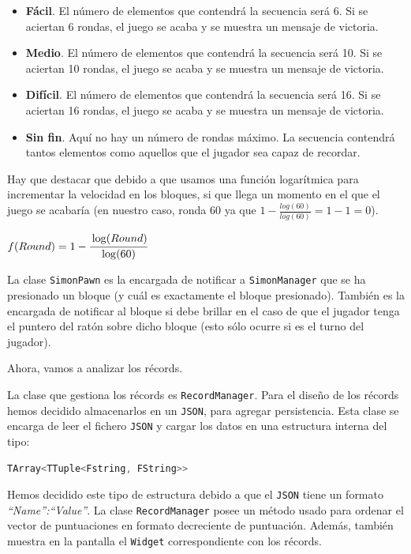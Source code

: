\documentclass{article}
\begin{document}
\begin{itemize}
\item \textbf{Fácil}. El número de elementos que contendrá la secuencia será 6. Si se aciertan 6 rondas, el juego se acaba y se muestra un mensaje de victoria.
\item \textbf{Medio}. El número de elementos que contendrá la secuencia será 10. Si se aciertan 10 rondas, el juego se acaba y se muestra un mensaje de victoria.
\item \textbf{Difícil}. El número de elementos que contendrá la secuencia será 16. Si se aciertan 16 rondas, el juego se acaba y se muestra un mensaje de victoria.
\item \textbf{Sin fin}. Aquí no hay un número de rondas máximo. La secuencia contendrá tantos elementos como aquellos que el jugador sea capaz de recordar. 
\end{itemize}

Hay que destacar que debido a que usamos una función logarítmica para incrementar la velocidad en los bloques, si que llega un momento en el que el juego se acabaría (en nuestro caso, ronda 60 ya que $1 - \frac{log(60)}{log(60)} = 1 - 1 = 0$).

\begin{center}
$ f(Round) = 1 - \cfrac{\log(Round)}{\log(60)}$ 
\end{center}
\vspace*{0.15in}

La clase \texttt{SimonPawn} es la encargada de notificar a \texttt{SimonManager} que se ha presionado un bloque (y cuál es exactamente el bloque presionado). También es la encargada de notificar al bloque si debe brillar en el caso de que el jugador tenga el puntero del ratón sobre dicho bloque (esto sólo ocurre si es el turno del jugador).

\vspace*{0.15in}

Ahora, vamos a analizar los récords.

La clase que gestiona los récords es \texttt{RecordManager}. Para el diseño de los récords hemos decidido almacenarlos en un \texttt{JSON}, para agregar persistencia. Esta clase se encarga de leer el fichero \texttt{JSON} y cargar los datos en una estructura interna del tipo:

\begin{lstlisting}[language=C++]
TArray<TTuple<Fstring, FString>>
\end{lstlisting}

Hemos decidido este tipo de estructura debido a que el \texttt{JSON} tiene un formato \textit{``Name'':``Value''}. La clase \texttt{RecordManager} posee un método usado para ordenar el vector de puntuaciones en formato decreciente de puntuación. Además, también muestra en la pantalla el \texttt{Widget} correspondiente con los récords.
\end{document}
